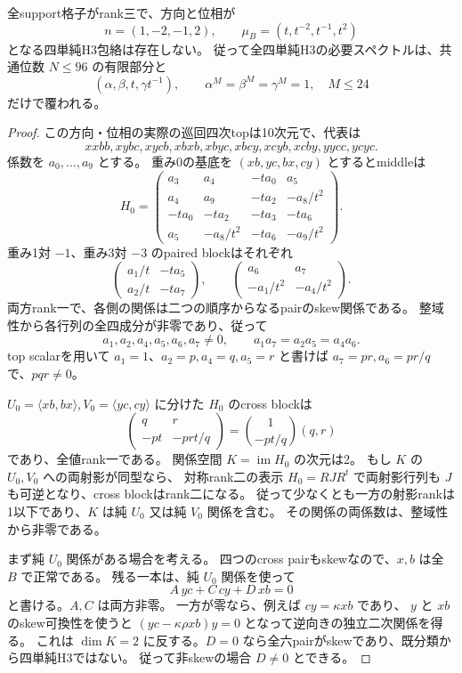 \begin{theorem}
\label{thm:cubic-last-rank3-curve-empty}
全support格子がrank三で、方向と位相が
\[
 n=(1,-2,-1,2),\qquad \mu_B=(t,t^{-2},t^{-1},t^2)
\]
となる四単純H3包絡は存在しない。
従って全四単純H3の必要スペクトルは、共通位数 $N\le96$ の有限部分と
\[
 (\alpha,\beta,t,\gamma t^{-1}),\qquad
 \alpha^M=\beta^M=\gamma^M=1,\quad M\le24
\]
だけで覆われる。
\end{theorem}
\begin{proof}
この方向・位相の実際の巡回四次topは10次元で、代表は
\[
 xxbb,xybc,xycb,xbxb,xbyc,xbcy,xcyb,xcby,yycc,ycyc.
\]
係数を $a_0,\ldots,a_9$ とする。
重み0の基底を $(xb,yc,bx,cy)$ とするとmiddleは
\[
 H_0=\begin{pmatrix}
 a_3&a_4&-ta_0&a_5\\
 a_4&a_9&-ta_2&-a_8/t^2\\
 -ta_0&-ta_2&-ta_3&-ta_6\\
 a_5&-a_8/t^2&-ta_6&-a_9/t^2
 \end{pmatrix}.
\]
重み1対 $-1$、重み3対 $-3$ のpaired blockはそれぞれ
\[
 \begin{pmatrix}a_1/t&-ta_5\\a_2/t&-ta_7\end{pmatrix},\qquad
 \begin{pmatrix}a_6&a_7\\-a_1/t^2&-a_4/t^2\end{pmatrix}.
\]
両方rank一で、各側の関係は二つの順序からなるpairのskew関係である。
整域性から各行列の全四成分が非零であり、従って
\[
 a_1,a_2,a_4,a_5,a_6,a_7\ne0,\qquad
 a_1a_7=a_2a_5=a_4a_6.
\]
top scalarを用いて $a_1=1$、$a_2=p,a_4=q,a_5=r$ と書けば
$a_7=pr,a_6=pr/q$ で、$pqr\ne0$。

$U_0=\langle xb,bx\rangle,V_0=\langle yc,cy\rangle$ に分けた $H_0$ のcross blockは
\[
 \begin{pmatrix}q&r\\-pt&-prt/q\end{pmatrix}
 =\binom{1}{-pt/q}(q,r)
\]
であり、全値rank一である。
関係空間 $K=\operatorname{im}H_0$ の次元は2。
もし $K$ の $U_0,V_0$ への両射影が同型なら、
対称rank二の表示 $H_0=RJR^t$ で両射影行列も $J$ も可逆となり、cross blockはrank二になる。
従って少なくとも一方の射影rankは1以下であり、$K$ は純 $U_0$ 又は純 $V_0$ 関係を含む。
その関係の両係数は、整域性から非零である。

まず純 $U_0$ 関係がある場合を考える。
四つのcross pairもskewなので、$x,b$ は全 $B$ で正常である。
残る一本は、純 $U_0$ 関係を使って
\[
 A\,yc+C\,cy+D\,xb=0
\]
と書ける。$A,C$ は両方非零。
一方が零なら、例えば $cy=\kappa xb$ であり、
$y$ と $xb$ のskew可換性を使うと
$(yc-\kappa\rho xb)y=0$ となって逆向きの独立二次関係を得る。
これは $\dim K=2$ に反する。$D=0$ なら全六pairがskewであり、既分類から四単純H3ではない。
従って非skewの場合 $D\ne0$ とできる。


\end{proof}
